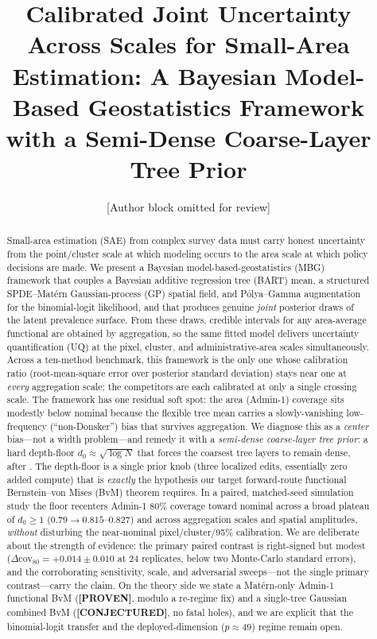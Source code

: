 \documentclass[11pt]{article}
\title{\bf Calibrated Joint Uncertainty Across Scales for Small-Area
Estimation: A Bayesian Model-Based Geostatistics Framework with a
Semi-Dense Coarse-Layer Tree Prior}
\author{[Author block omitted for review]}
\date{}
\theoremstyle{remark}
\newcommand{\PROVEN}{\textnormal{\textbf{\textcolor{green!45!black}{[PROVEN]}}}}
\newcommand{\CONJ}{\textnormal{\textbf{\textcolor{orange!75!black}{[CONJECTURED]}}}}
\newcommand{\dz}{d_0}
\newcommand{\cov}{\mathrm{cov}}
\begin{document}
\maketitle

\begin{abstract}
Small-area estimation (SAE) from complex survey data must carry honest
uncertainty from the point/cluster scale at which modeling occurs to the
area scale at which policy decisions are made. We present a Bayesian
model-based-geostatistics (MBG) framework that couples a Bayesian additive
regression tree (BART) mean, a structured SPDE--Mat\'ern Gaussian-process (GP)
spatial field, and P\'olya--Gamma augmentation for the binomial-logit
likelihood, and that produces genuine \emph{joint} posterior draws of the
latent prevalence surface. From these draws, credible intervals for any
area-average functional are obtained by aggregation, so the same fitted model
delivers uncertainty quantification (UQ) at the pixel, cluster, and
administrative-area scales simultaneously. Across a ten-method benchmark, this
framework is the only one whose calibration ratio (root-mean-square error over
posterior standard deviation) stays near one at \emph{every} aggregation scale;
the competitors are each calibrated at only a single crossing scale. The framework
has one residual soft spot: the area (Admin-1) coverage sits modestly below
nominal because the flexible tree mean carries a slowly-vanishing
low-frequency (``non-Donsker'') bias that survives aggregation. We diagnose this
as a \emph{center} bias---not a width problem---and remedy it with a
\emph{semi-dense coarse-layer tree prior}: a hard depth-floor $\dz \approx
\sqrt{\log N}$ that forces the coarsest tree layers to remain dense, after
\citet{castillo2021cart}. The depth-floor is a single prior knob (three
localized edits, essentially zero added compute) that is \emph{exactly} the
hypothesis our target forward-route functional Bernstein--von Mises (BvM)
theorem requires. In a paired, matched-seed simulation study the floor recenters
Admin-1 80\% coverage toward nominal across a broad plateau of $\dz \ge 1$
($0.79 \to 0.815$--$0.827$) and across aggregation scales and spatial amplitudes,
\emph{without} disturbing the near-nominal pixel/cluster/95\% calibration. We are
deliberate about the strength of evidence: the primary paired contrast is
right-signed but modest ($\Delta\cov_{80}=+0.014\pm0.010$ at 24 replicates, below
two Monte-Carlo standard errors), and the corroborating sensitivity, scale, and
adversarial sweeps---not the single primary contrast---carry the claim. On the
theory side we state a Mat\'ern-only Admin-1 functional BvM (\PROVEN, modulo a
re-regime fix) and a single-tree Gaussian combined BvM (\CONJ, no fatal holes),
and we are explicit that the binomial-logit transfer and the deployed-dimension
($p\approx 49$) regime remain open.
\end{abstract}
\end{document}
